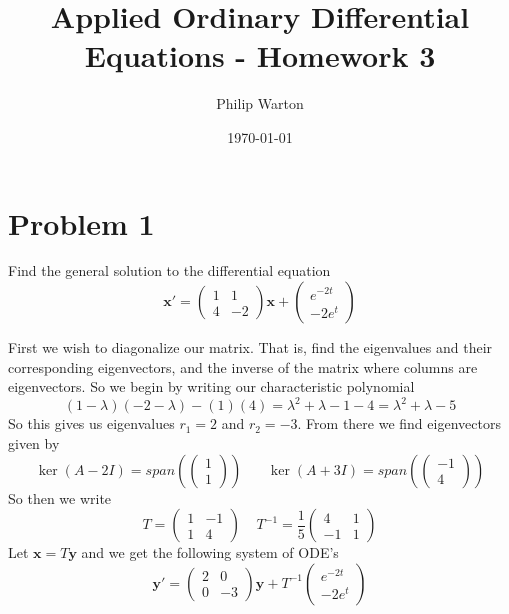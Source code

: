\documentclass{article}
\theoremstyle{definition}
\begin{document}
\title{Applied Ordinary Differential Equations - Homework 3}
\author{Philip Warton}
\date{\today}
\maketitle
\section*{Problem 1}
    \begin{mdframed}[]
        Find the general solution to the differential equation 
        \[
            \bm x' = \begin{pmatrix}
                1 & 1 \\
                4 & -2
            \end{pmatrix} \bm x + \begin{pmatrix}
                e^{-2t} \\
                -2e^t
            \end{pmatrix}
        \]
    \end{mdframed}
    First we wish to diagonalize our matrix. That is, find the eigenvalues and their corresponding eigenvectors, 
    and the inverse of the matrix where columns are eigenvectors.
    So we begin by writing our characteristic polynomial 
    \[
        (1 - \lambda)(-2 - \lambda) - (1)(4) = \lambda^2 + \lambda - 1 - 4 = \lambda^2 + \lambda - 5    
    \] 
    So this gives us eigenvalues $r_1 = 2$ and $r_2 = -3$. From there we find eigenvectors given by 
    \[
        \ker(A - 2I) = span(\begin{pmatrix}
            1 \\ 1
        \end{pmatrix})   
        \ \ \ \ \ \ \ \
        \ker(A + 3I) = span(\begin{pmatrix}
            -1 \\ 4
        \end{pmatrix})
    \]
    So then we write 
    \[
        T = \begin{pmatrix}
            1 & -1 \\
            1 & 4
        \end{pmatrix}    
        \ \ \ \ \ T^{-1} = \frac{1}{5}\begin{pmatrix}
           4 & 1 \\
           -1 & 1 
        \end{pmatrix}
    \]
    Let $\bm x = T \bm y$ and we get the following system of ODE's 
    \[
        \bm y' = \begin{pmatrix}
            2 & 0 \\
            0 & -3
        \end{pmatrix}   
        \bm y + T^{-1}\begin{pmatrix}
            e^{-2t} \\
            -2e^t
        \end{pmatrix}
    \]
\end{document}
